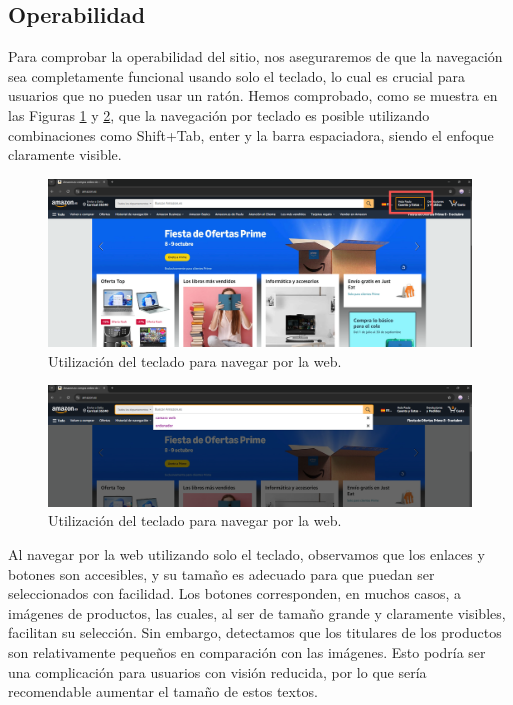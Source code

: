 \documentclass[letterpaper, 12pt]{report}
\begin{document}
\subsection{Operabilidad}

Para comprobar la operabilidad del sitio, nos aseguraremos de que la navegación sea completamente funcional usando solo el teclado, lo cual es crucial para usuarios que no pueden usar un ratón. Hemos comprobado, como se muestra en las Figuras \ref{fig:12} y \ref{fig:13}, que la navegación por teclado es posible utilizando combinaciones como Shift+Tab, enter y la barra espaciadora, siendo el enfoque claramente visible.

\begin{figure}[H]
\centering
\includegraphics[width=1\textwidth]{figure12.png}
\caption{Utilización del teclado para navegar por la web.}
\label{fig:12}
\end{figure}

\begin{figure}[H]
\centering
\includegraphics[width=1\textwidth]{figure13.png}
\caption{Utilización del teclado para navegar por la web.}
\label{fig:13}
\end{figure}

Al navegar por la web utilizando solo el teclado, observamos que los enlaces y botones son accesibles, y su tamaño es adecuado para que puedan ser seleccionados con facilidad. Los botones corresponden, en muchos casos, a imágenes de productos, las cuales, al ser de tamaño grande y claramente visibles, facilitan su selección. Sin embargo, detectamos que los titulares de los productos son relativamente pequeños en comparación con las imágenes. Esto podría ser una complicación para usuarios con visión reducida, por lo que sería recomendable aumentar el tamaño de estos textos.
\end{document}
